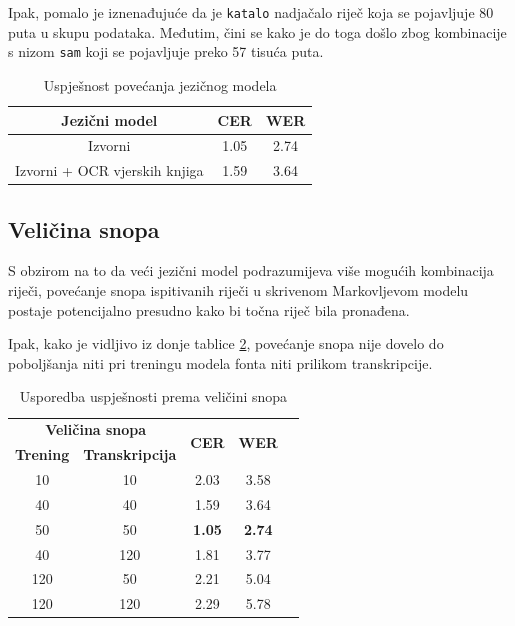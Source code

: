 \documentclass[zavrsnirad]{fer}
\begin{document}
Ipak, pomalo je iznenađujuće da je \texttt{katalo} nadjačalo riječ koja se pojavljuje 80 puta u skupu podataka. Međutim, čini se kako je do toga došlo zbog kombinacije s nizom \texttt{sam} koji se pojavljuje preko 57 tisuća puta.



\bgroup
\def\arraystretch{1.25}
\begin{table}[h]
	\centering
	\begin{tabular}{|c|c|c|}
		\hline
		 \textbf{Jezični model} & \textbf{CER} & \textbf{WER} \\ \hline
		 Izvorni & 1.05 & 2.74 \\ \hline
		 Izvorni + OCR vjerskih knjiga & 1.59 & 3.64 \\ \hline
	\end{tabular}
	\caption{Uspješnost povećanja jezičnog modela}
	\label{tab:lm_performance}
\end{table}
\egroup



\subsection{Veličina snopa}

S obzirom na to da veći jezični model podrazumijeva više mogućih kombinacija riječi, povećanje snopa ispitivanih riječi u skrivenom Markovljevom modelu postaje potencijalno presudno kako bi točna riječ bila pronađena.

Ipak, kako je vidljivo iz donje tablice \ref{tab:7.2}, povećanje snopa nije dovelo do poboljšanja niti pri treningu modela fonta niti prilikom transkripcije.

\bgroup
\def\arraystretch{1.25}
\begin{table}[h]
	\centering
	\begin{tabular}{|c|c|c|c|c|}
		\hline 
		\multicolumn{2}{|c|}{\textbf{Veličina snopa}} & \multicolumn{1}{|c|}{\multirow{2}{*}{\textbf{CER}}} & \multicolumn{1}{|c|}{\multirow{2}{*}{\textbf{WER}}} \\ \cline{1-2}
		
		\textbf{Trening}  & \textbf{Transkripcija}  & \multicolumn{1}{|c|}{}  & \multicolumn{1}{|c|}{}  \\ \hline
		10  & 10 &  2.03 & 3.58  \\ \hline
		40 & 40 &  1.59 & 3.64   \\ \hline
		50 & 50 &  \textbf{1.05} & \textbf{2.74}   \\ \hline
		40 & 120 & 1.81 & 3.77   \\ \hline
		120 & 50 & 2.21 & 5.04 \\ \hline        
		120 & 120 & 2.29 & 5.78 \\ \hline                                             
	\end{tabular}
	\caption{Usporedba uspješnosti prema veličini snopa}
	\label{tab:7.2}
\end{table}
\egroup
\end{document}
